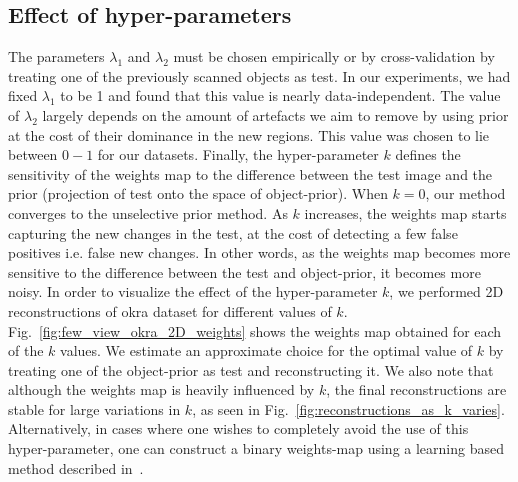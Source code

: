 \documentclass[journal]{IEEEtran}
\begin{document}
\subsection{Effect of hyper-parameters}
\label{subsec:k}
The parameters $\lambda_1$ and $\lambda_2$ must be chosen empirically or by cross-validation by treating one of the previously scanned objects as test. In our experiments, we had fixed $\lambda_1$ to be 1 and found that this value is nearly data-independent. The value of $\lambda_2$ largely depends on the amount of artefacts we aim to remove by using prior at the cost of their dominance in the new regions. This value was chosen to lie between $0-1$ for our datasets. Finally, the hyper-parameter $k$ defines the sensitivity of the weights map to the difference between the test image and the prior (projection of test onto the space of object-prior). When $k=0$, our method converges to the unselective prior method. As $k$ increases, the weights map starts capturing the new changes in the test, at the cost of detecting a few false positives i.e. false new changes. In other words, as the weights map becomes more sensitive to the difference between the test and object-prior, it becomes more noisy. In order to visualize the effect of the hyper-parameter $k$, we performed 2D reconstructions of okra dataset for different values of $k$. Fig.~\ref{fig:few_view_okra_2D_weights} shows the weights map obtained for each of the $k$ values. We estimate an approximate choice for the optimal value of $k$ by treating one of the object-prior as test and reconstructing it. We also note that although the weights map is heavily influenced by $k$, the final reconstructions are stable for large variations in $k$, as seen in Fig.~\ref{fig:reconstructions_as_k_varies}. Alternatively, in cases where one wishes to completely avoid the use of this hyper-parameter, one can construct a binary weights-map using a learning based method described in~\cite{supp_paper}.

\end{document}
